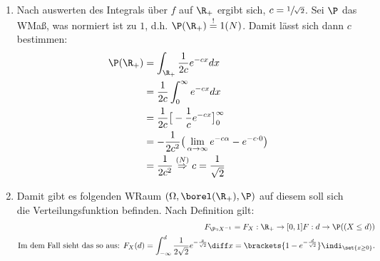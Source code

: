 \begin{lösung}
	\begin{enumerate}[label=\alph*)]
		\item Nach auswerten des Integrals über $f$ auf $\R_{+}$ ergibt sich, $c = \sfrac{1}{\sqrt{2}}$.
		Sei $\P$ das WMaß, was normiert ist zu $1$, d.h. $\P(\R_{+}) \overset{!}{=}1 (N)$. Damit lässt sich dann $c$ bestimmen:
		\begin{align*}
			\P(\R_{+}) &= \int_{\R_{+}} \frac{1}{2c} e^{-cx} dx\\
			&= \frac{1}{2c} \int_{0}^{\infty}  e^{-cx} dx \\
			&= \frac{1}{2c} \big[-\frac{1}{c} e^{-cx}\big]_{0}^{\infty}\\
			&= -\frac{1}{2c^2} \big(\lim\limits_{\alpha \to \infty} e^{-c\alpha} - e^{-c\cdot0}\big)\\
			&= \frac{1}{2c^2} \overset{(N)}{\Rightarrow} c = \frac{1}{\sqrt{2}} 
		\end{align*}
		\item Damit gibt es folgenden WRaum $(\Omega, \borel(\R_{+}),\P)$ auf diesem soll sich die Verteilungsfunktion befinden. Nach Definition gilt: 
		\begin{align*}
			F_{\P \circ X^{-1}} = F_{X}: \R_{+} \to [0,1] \mit F: d \to \P((X \le d))\notag\\
			\text{Im dem Fall sieht das so aus: } F_{X}(d) = \int_{-\infty}^{d} \frac{1}{2\sqrt{2}} e^{-\frac{x}{\sqrt{2}}} \diff x = \brackets{1 - e^{-\frac{d}{\sqrt{2}}}}\indi_{\set{x \ge 0}}.\notag\\
		\end{align*}
	\end{enumerate}
\end{lösung}


